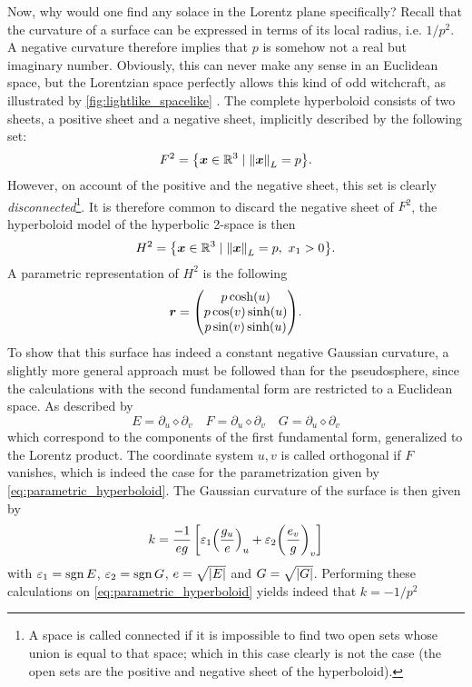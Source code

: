Now, why would one find any solace in the Lorentz plane specifically? Recall that the curvature of a surface can be expressed in terms of its local radius, i.e. \(1/p^2\). A negative curvature therefore implies that \(p\) is somehow not a real but imaginary number. Obviously, this can never make any sense in an Euclidean space, but the Lorentzian space perfectly allows this kind of odd witchcraft, as illustrated by \cref{fig:lightlike_spacelike} \cite{Ratcliffe2019}. The complete hyperboloid consists of two sheets, a positive sheet and a negative sheet, implicitly described by the following set: 
\[ F^2 = \qty{\vec{x} \in \real^3 \mid \lnorm{\vec{x}} = p}. \]
However, on account of the positive and the negative sheet, this set is clearly \emph{disconnected}\footnote{A space is called connected if it is impossible to find two open sets whose union is equal to that space; which in this case clearly is not the case (the open sets are the positive and negative sheet of the hyperboloid).}. It is therefore common to discard the negative sheet of \(F^2\), the hyperboloid model of the hyperbolic 2-space is then \cite{Ratcliffe2019}
\[ H^2 = \qty{\vec{x} \in \real^3 \mid \lnorm{\vec{x}} = p,\ x_1 > 0}. \]
A parametric representation of \(H^2\) is the following
\begin{equation}
    \vec{r} = \mqty(p\cosh(u)\\p\cos(v)\sinh(u)\\p\sin(v)\sinh(u)).
    \label{eq:parametric_hyperboloid}
\end{equation}
To show that this surface has indeed a constant negative Gaussian curvature, a slightly more general approach must be followed than for the pseudosphere, since the calculations with the second fundamental form are restricted to a Euclidean space. As described by \citet{ONeill1983}
\[ E = \partial_u \diamond \partial_v \quad F = \partial_u \diamond \partial_v \quad G = \partial_u \diamond \partial_v \]
which correspond to the components of the first fundamental form, generalized to the Lorentz product. The coordinate system \(u, v\) is called orthogonal if \(F\) vanishes, which is indeed the case for the parametrization given by \cref{eq:parametric_hyperboloid}.
The Gaussian curvature of the surface is then given by \cite{ONeill1983}
\begin{equation}
    k = \frac{-1}{eg}\left[\varepsilon_1\qty(\frac{g_u}{e})_u + \varepsilon_2\qty(\frac{e_v}{g})_v\right]
    \label{eq:orthogonal_gaussian_curvature}
\end{equation}
with \(\varepsilon_1 = \operatorname{sgn}{E}\), \(\varepsilon_2 = \operatorname{sgn}{G}\), \(e = \sqrt{\abs{E}}\) and \(G = \sqrt{\abs{G}}\).
Performing these calculations on \cref{eq:parametric_hyperboloid} yields indeed that \(k = -1/p^2\)

